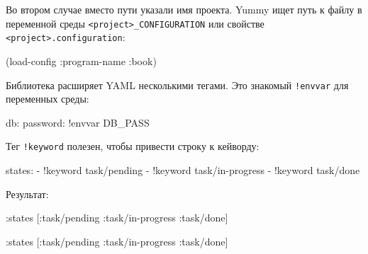 \fi

Во втором случае вместо пути указали имя проекта. Yummy ищет путь к файлу в
переменной среды \verb|<project>_CONFIGURATION| или свойстве
\verb|<project>.configuration|:

\begin{english}
\end{english}

\begin{english}
  \begin{clojure}
(load-config {:program-name :book})
  \end{clojure}
\end{english}

Библиотека расширяет YAML несколькими тегами. Это знакомый \verb|!envvar|
для переменных среды:


\begin{english}
  \begin{yaml}
db:
  password: !envvar DB_PASS
  \end{yaml}
\end{english}

\noindent
Тег \verb|!keyword| полезен, чтобы привести строку к кейворду:

\begin{english}
  \begin{yaml}
states:
  - !keyword task/pending
  - !keyword task/in-progress
  - !keyword task/done
  \end{yaml}
\end{english}

\noindent
Результат:

\ifx\DEVICETYPE\MOBILE

\begin{english}
  \begin{clojure}
{:states [:task/pending
          :task/in-progress
          :task/done]}
  \end{clojure}
\end{english}

\else

\begin{english}
  \begin{clojure}
{:states [:task/pending :task/in-progress :task/done]}
  \end{clojure}
\end{english}

